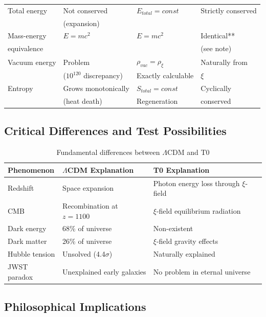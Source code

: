 \begin{longtable}{p{4.0cm}p{3.2cm}p{2.8cm}p{2.8cm}}
	Total energy & Not conserved & $E_{total} = const$ & Strictly conserved \\
	& (expansion) & & \\[0.3em]
	
	Mass-energy & $E = mc^2$ & $E = mc^2$ & Identical** \\
	equivalence & & & (see note) \\[0.3em]
	
	Vacuum energy & Problem & $\rho_{vac} = \rho_\xi$ & Naturally from \\
	& ($10^{120}$ discrepancy) & Exactly calculable & $\xi$ \\[0.3em]
	
	Entropy & Grows monotonically & $S_{total} = const$ & Cyclically \\
	& (heat death) & Regeneration & conserved \\[0.3em]
	
\end{longtable}
\normalsize

\subsection{Critical Differences and Test Possibilities}
\label{subsec:critical_differences}

\begin{table}[h]
	\centering
	\begin{tabular}{p{4cm}p{5cm}p{5cm}}
		\toprule
		\textbf{Phenomenon} & \textbf{$\Lambda$CDM Explanation} & \textbf{T0 Explanation} \\
		\midrule
		Redshift & Space expansion & Photon energy loss through $\xi$-field \\
		CMB & Recombination at $z=1100$ & $\xi$-field equilibrium radiation \\
		Dark energy & 68\% of universe & Non-existent \\
		Dark matter & 26\% of universe & $\xi$-field gravity effects \\
		Hubble tension & Unsolved (4.4$\sigma$) & Naturally explained \\
		JWST paradox & Unexplained early galaxies & No problem in eternal universe \\
		\bottomrule
	\end{tabular}
	\caption{Fundamental differences between $\Lambda$CDM and T0}
\end{table}

\subsection{Philosophical Implications}
\label{subsec:philosophical_implications}

